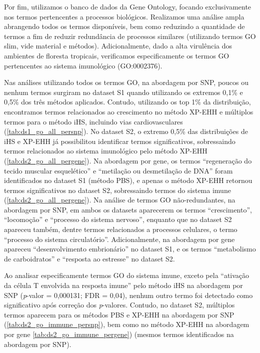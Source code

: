

Por fim, utilizamos o banco de dados da Gene Ontology, focando exclusivamente nos termos pertencentes a processos biológicos. Realizamos uma análise ampla abrangendo todos os termos disponíveis, bem como reduzindo a quantidade de termos a fim de reduzir redundância de processos similares (utilizando termos GO slim, vide material e métodos). Adicionalmente, dado a alta virulência dos ambientes de floresta tropicais, verificamos especificamente os termos GO pertencentes ao sistema imunológico (GO:0002376).

Nas análises utilizando todos os termos GO, na abordagem por SNP, poucos ou nenhum termos surgiram no dataset S1 quando utilizando os extremos 0,1\% e 0,5\% dos três métodos aplicados. Contudo, utilizando os top 1\% da distribuição, encontramos termos relacionados ao crescimento no método XP-EHH e múltiplos termos para o método iHS, incluindo vias cardiovasculares (\autoref{tab:ds1_go_all_persnp}). No dataset S2, o extremo 0,5\% das distribuições de iHS e XP-EHH já possibilitou identificar termos significativos, sobressaindo termos relacionados ao sistema imunológico pelo método XP-EHH (\autoref{tab:ds2_go_all_pergene}). Na abordagem por gene, os termos “regeneração do tecido muscular esquelético” e “metilação ou desmetilação de DNA” foram identificados no dataset S1 (método PBS), e apenas o método XP-EHH retornou termos significativos no dataset S2, sobressaindo termos do sistema imune (\autoref{tab:ds2_go_all_pergene}). Na análise de termos GO não-redundantes, na abordagem por SNP, em ambos os datasets aparecerem os termos “crescimento”, “locomoção” e “processo do sistema nervoso”, enquanto que no dataset S2 apareceu também, dentre termos relacionados a processos celulares, o termo “processo do sistema circulatório”. Adicionalmente, na abordagem por gene apareceu “desenvolvimento embrionário” no dataset S1, e os termos “metabolismo de carboidratos” e “resposta ao estresse” no dataset S2.



Ao analisar especificamente termos GO do sistema imune, exceto pela “ativação da célula T envolvida na resposta imune” pelo método iHS na abordagem por SNP (\emph{p}-valor = 0,000131; FDR = 0,04), nenhum outro termo foi detectado como significativo após correção dos \emph{p}-valores. Contudo, no dataset S2, múltiplos termos aparecem para os métodos PBS e XP-EHH na abordagem por SNP (\autoref{tab:ds2_go_immune_persnp}), bem como no método XP-EHH na abordagem por gene \ref{tab:ds2_go_immune_pergene}) (mesmos termos identificados na abordagem por SNP).

